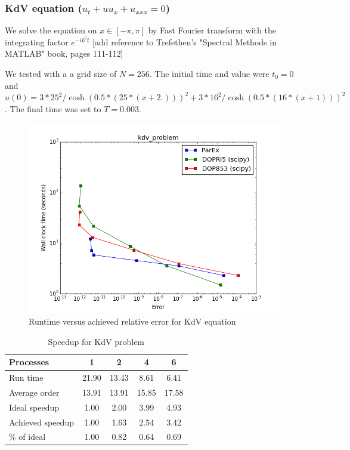 \documentclass[12pt]{article}
\begin{document}
\subsubsection{KdV equation ($u_t+uu_x+u_{xxx}=0$)}
We solve the equation on $x \in [-\pi,\pi]$  by Fast Fourier transform with the integrating factor $e^{-ik^3t}$ [add reference to Trefethen's "Spectral Methods in MATLAB" book, pages 111-112]

We tested with a a grid size of $N=256$. The initial time and value were $t_0=0$ and $u(0) = 3*25^2/\cosh(0.5*(25*(x+2.)))^2 + 3*16^2/\cosh(0.5*(16*(x+1)))^2 $. The final time was set to $T = 0.003$.
\begin{figure}[h]
 \includegraphics[scale=0.5]{images/kdv_problem_err_vs_time.png}
\centering
\caption{Runtime versus achieved relative error for KdV equation}
\end{figure}

\begin{table}
\caption{Speedup for KdV problem\label{tbl:KdV}}{
\begin{tabular}{lcccc}\\
Processes & 1 & 2 & 4 & 6\\ \hline
Run time & 21.90 & 13.43 &  8.61 &  6.41 \\
Average order & 13.91 & 13.91 & 15.85 & 17.58 \\
Ideal speedup &  1.00 &  2.00 &  3.99 &  4.93 \\
Achieved speedup &  1.00 &  1.63 &  2.54 &  3.42 \\
\% of ideal &  1.00 &  0.82 &  0.64 &  0.69 \\ \hline
\end{tabular}}
\end{table}
\end{document}
